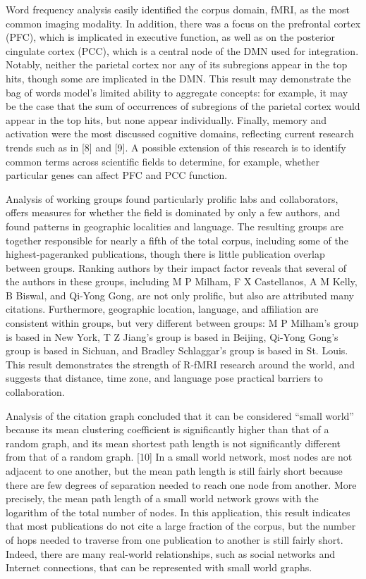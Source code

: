 \documentclass[12pt,3p,review,number]{elsarticle}
\begin{document}
Word frequency analysis easily identified the corpus domain, fMRI, as the most
common imaging modality. In addition, there was a focus on the prefrontal cortex
(PFC), which is implicated in executive function, as well as on the posterior
cingulate cortex (PCC), which is a central node of the DMN used for integration.
Notably, neither the parietal cortex nor any of its subregions appear in the top
hits, though some are implicated in the DMN. This result may demonstrate the bag
of words model’s limited ability to aggregate concepts: for example, it may be
the case that the sum of occurrences of subregions of the parietal cortex would
appear in the top hits, but none appear individually. Finally, memory and
activation were the most discussed cognitive domains, reflecting current
research trends such as in [8] and [9]. A possible extension of this research is
to identify common terms across scientific fields to determine, for example,
whether particular genes can affect PFC and PCC function.

Analysis of working groups found particularly prolific labs and collaborators,
offers measures for whether the field is dominated by only a few authors, and
found patterns in geographic localities and language. The resulting groups are
together responsible for nearly a fifth of the total corpus, including some of
the highest-pageranked publications, though there is little publication overlap
between groups. Ranking authors by their impact factor reveals that several of
the authors in these groups, including M P Milham, F X Castellanos, A M Kelly, B
Biswal, and Qi-Yong Gong, are not only prolific, but also are attributed many
citations. Furthermore, geographic location, language, and affiliation are
consistent within groups, but very different between groups: M P Milham’s group
is based in New York, T Z Jiang’s group is based in Beijing, Qi-Yong Gong’s
group is based in Sichuan, and Bradley Schlaggar’s group is based in St. Louis.
This result demonstrates the strength of R-fMRI research around the world, and
suggests that distance, time zone, and language pose practical barriers to
collaboration.

Analysis of the citation graph concluded that it can be considered ``small
world'' because its mean clustering coefficient is significantly higher than
that of a random graph, and its mean shortest path length is not significantly
different from that of a random graph. [10] In a small world network, most nodes
are not adjacent to one another, but the mean path length is still fairly short
because there are few degrees of separation needed to reach one node from
another. More precisely, the mean path length of a small world network grows
with the logarithm of the total number of nodes. In this application, this
result indicates that most publications do not cite a large fraction of the
corpus, but the number of hops needed to traverse from one publication to
another is still fairly short. Indeed, there are many real-world relationships,
such as social networks and Internet connections, that can be represented with
small world graphs. 
\end{document}
